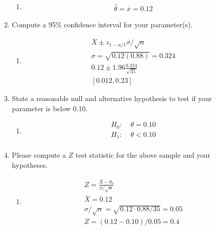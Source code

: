 \documentclass[krantz1,ChapterTOCs]{krantz}
\begin{document}
\begin{enumerate}
\begin{enumerate}
        \begin{enumerate}
            \item {\color{red}
                \begin{align}
                    \hat{\theta} = \overline{x} = 0.12
                \end{align}
            
            }
        \end{enumerate}
    
        
        \item Compute a 95\% confidence interval for your parameter(s).
        
        \begin{enumerate}
            \item {\color{red} 
                \begin{align}
                    \overline{X} \pm z_{1-\alpha/1} \sigma/\sqrt{n} \\ 
                    \sigma = \sqrt{0.12 (0.88)} = 0.324\\
                    0.12 \pm 1.96 \frac{0.324}{\sqrt{35}} \\
                    [0.012 , 0.23]
                \end{align}
            
            }
        \end{enumerate}
    
        
        \item State a reasonable null and alternative hypothesis to test if your parameter is below 0.10.
        
        \begin{enumerate}
            \item {\color{red} 
                \begin{align}
                    H_{0}: \; & \theta = 0.10 \\ 
                    H_{1}: \; & \theta < 0.10 \\ 
                \end{align}
                
            }
        \end{enumerate}
    
        
        \item Please compute a $Z$ test statistic for the above sample and your hypotheses.
        
        \begin{enumerate}
            \item {\color{red} 
                \begin{align}
                     Z = \frac{\overline{X} - \theta_{0}}{\sigma/\sqrt{n}} \\
                     \overline{X} = 0.12\\
                     \sigma / \sqrt{n} = \sqrt{0.12 \cdot 0.88 / 35} = 0.05\\
                     Z = (0.12-0.10)/0.05 = 0.4
                \end{align}
                
}
\end{enumerate}
\end{enumerate}
\end{enumerate}
\end{document}
